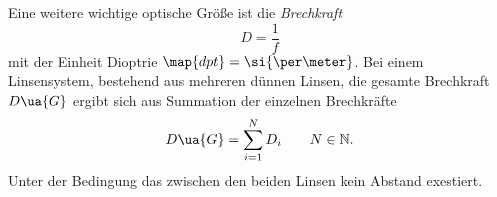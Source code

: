 Eine weitere wichtige optische Größe ist die \emph{Brechkraft}
\begin{equation}
  \label{eq: brechkraft}
  D=\frac{1}{f}
\end{equation}
mit der Einheit Dioptrie $\map{dpt}=\si{\per \meter}$.
Bei einem Linsensystem, bestehend aus mehreren dünnen Linsen, die gesamte %
Brechkraft $D\ua{G}$ ergibt sich aus Summation der einzelnen Brechkräfte %
\begin{equation*}
  D\ua{G}=\sum_{i=1}^{N}D_i \qquad N\in\mathbb{N}.
\end{equation*}
Unter der Bedingung das zwischen den beiden Linsen kein Abstand exestiert. %
